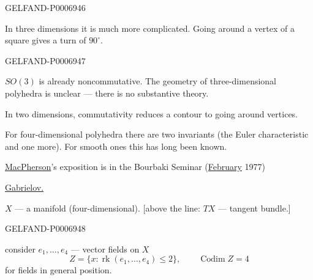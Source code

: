 \begin{GelfandAdjacentEvidence}{GELFAND-P000694}{6}


In three dimensions it is much more complicated. Going around a vertex of a square gives a turn of \(90^\circ\).

\end{GelfandAdjacentEvidence}
\begin{GelfandAdjacentEvidence}{GELFAND-P000694}{7}


\(SO(3)\) is already noncommutative. The geometry of three-dimensional polyhedra is unclear --- there is no substantive theory.

In two dimensions, commutativity reduces a contour to going around vertices.

For four-dimensional polyhedra there are two invariants (the Euler characteristic and one more). For smooth ones this has long been known.

\underline{MacPherson}’s exposition is in the Bourbaki Seminar (\underline{February} 1977)

\underline{Gabrielov.}

\(X\) --- a manifold (four-dimensional).
[above the line: \(TX\) --- tangent bundle.]
\end{GelfandAdjacentEvidence}
\begin{GelfandAdjacentEvidence}{GELFAND-P000694}{8}

consider \(e_1,\ldots,e_4\) --- vector fields on \(X\)
\[
Z=\{x:\operatorname{rk}(e_1,\ldots,e_4)\leq 2\},\qquad\operatorname{Codim}Z=4
\]
for fields in general position.
\end{GelfandAdjacentEvidence}
